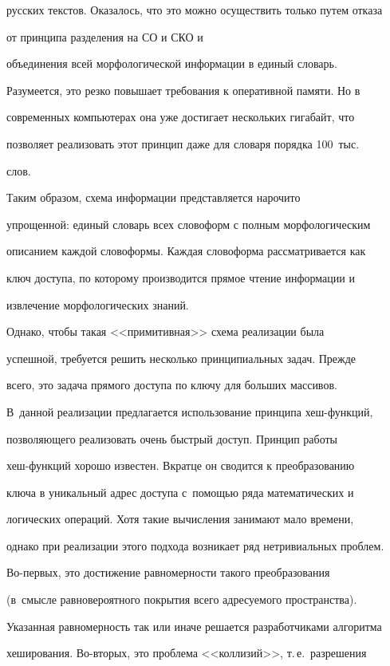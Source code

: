русских текстов. Оказалось, что это можно осуществить только путем отказа

от принципа разделения на СО и СКО и

объединения всей морфологической информации в единый словарь.

Разумеется, это резко повышает требования к оперативной памяти. Но в

современных компьютерах она уже достигает нескольких гигабайт, что

позволяет реализовать этот принцип даже для словаря порядка 100~тыс.\

слов.



    Таким образом, схема информации представляется нарочито

упрощенной: единый словарь всех словоформ с полным морфологическим

описанием каждой словоформы. Каждая словоформа рассматривается как

ключ доступа, по которому производится прямое чтение информации и

извлечение морфологических знаний.



    Однако, чтобы такая <<примитивная>> схема реализации была

успешной, требуется решить несколько принципиальных задач. Прежде

всего, это задача прямого доступа по ключу для больших массивов.

В~данной реализации предлагается использование принципа хеш-функ\-ций,

позволяющего реализовать очень быстрый доступ. Принцип работы

    хеш-функ\-ций хорошо известен. Вкратце он сводится к преобразованию

ключа в уникальный адрес доступа с~по\-мощью ряда математических и

логических операций. Хотя такие вычисления занимают мало времени,

однако при реализации этого подхода возникает ряд нетривиальных проблем.

Во-пер\-вых, это достижение равномерности такого преобразования

(в~смысле равновероятного покрытия всего адресуемого пространства).

Указанная равномерность так или иначе решается разработчиками алгоритма

хеширования. Во-вто\-рых, это проблема <<коллизий>>, т.\,е.\ разрешения

